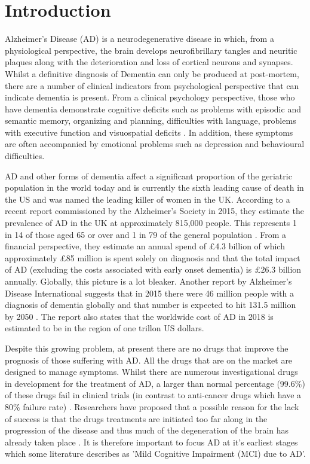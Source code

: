 \section{Introduction}
Alzheimer's Disease (AD) is a neurodegenerative disease in which, from a physiological perspective, the brain develops neurofibrillary tangles and neuritic plaques along with the deterioration and loss of cortical neurons and synapses. Whilst a definitive diagnosis of Dementia can only be produced at post-mortem, there are a number of clinical indicators from psychological perspective that can indicate dementia is present. From a clinical psychology perspective, those who have dementia demonstrate cognitive deficits such as problems with episodic and semantic memory, organizing and planning, difficulties with language, problems with executive function and visuospatial deficits \cite{McKhann2011}. In addition, these symptoms are often accompanied by emotional problems such as depression and behavioural difficulties. 
\par
AD and other forms of dementia affect a significant proportion of the geriatric population in the world today and is currently the sixth leading cause of death in the US and was named the leading killer of women in the UK. According to a recent report commissioned by the Alzheimer's Society in 2015, they estimate the prevalence of AD in the UK at approximately 815,000 people. This represents 1 in 14 of those aged 65 or over and 1 in 79 of the general population \cite{AlzheimersSociety2014}. From a financial perspective, they estimate an annual spend of £4.3 billion of which approximately £85 million is spent solely on diagnosis and that the total impact of AD (excluding the costs associated with early onset dementia) is £26.3 billion annually. Globally, this picture is a lot bleaker. Another report by Alzheimer's Disease International suggests that in 2015 there were 46 million people with a diagnosis of dementia globally and that number is expected to hit 131.5 million by 2050 \cite{Prince2015}. The report also states that the worldwide cost of AD in 2018 is estimated to be in the region of one trillon US dollars.
\par
Despite this growing problem, at present there are no drugs that improve the prognosis of those suffering with AD. All the drugs that are on the market are designed to manage symptoms. Whilst there are numerous investigational drugs in development for the treatment of AD, a larger than normal percentage (99.6\%) of these drugs fail in clinical trials (in contrast to anti-cancer drugs which have a 80\% failure rate) \cite{Cummings2014}. Researchers have proposed that a possible reason for the lack of success is that the drugs treatments are initiated too far along in the progression of the disease and thus much of the degeneration of the brain has already taken place \cite{Cummings2014}. It is therefore important to focus AD at it's earliest stages which some literature describes as 'Mild Cognitive Impairment (MCI) due to AD'.
